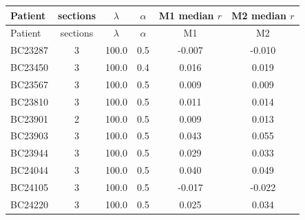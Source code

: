 \begin{longtable}{lccccc}\toprule
Patient & sections & $\lambda$ & $\alpha$ & M1 median $r$ & M2 median $r$ \\
\midrule
\endfirsthead
\toprule Patient & sections & $\lambda$ & $\alpha$ & M1 & M2 \\ \midrule \endhead
BC23287 & 3 & 100.0 & 0.5 & -0.007 & -0.010 \\
BC23450 & 3 & 100.0 & 0.4 & 0.016 & 0.019 \\
BC23567 & 3 & 100.0 & 0.5 & 0.009 & 0.009 \\
BC23810 & 3 & 100.0 & 0.5 & 0.011 & 0.014 \\
BC23901 & 2 & 100.0 & 0.5 & 0.009 & 0.013 \\
BC23903 & 3 & 100.0 & 0.5 & 0.043 & 0.055 \\
BC23944 & 3 & 100.0 & 0.5 & 0.029 & 0.033 \\
BC24044 & 3 & 100.0 & 0.5 & 0.040 & 0.049 \\
BC24105 & 3 & 100.0 & 0.5 & -0.017 & -0.022 \\
BC24220 & 3 & 100.0 & 0.5 & 0.025 & 0.034 \\
\bottomrule
\end{longtable}
